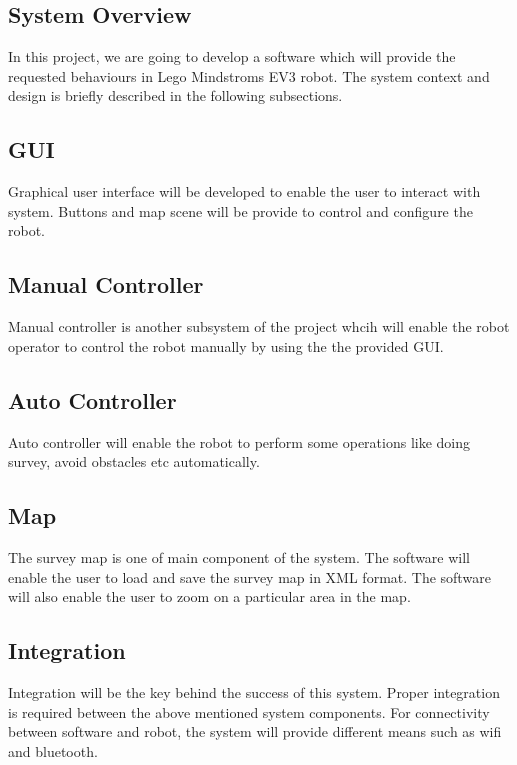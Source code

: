 \subsection{System Overview}
In this project, we are going to develop a software which will provide the requested behaviours in Lego Mindstroms EV3 robot. The system context and design is briefly described in the following subsections.
\subsection{GUI}
Graphical user interface will be developed to enable the user to interact with system. Buttons and map scene will be provide to control and configure the robot.  
\subsection{Manual Controller}
Manual controller is another subsystem of the project whcih will enable the robot operator to control the robot manually by using the the provided GUI. 
\subsection{Auto Controller}
Auto controller will enable the robot to perform some operations like doing survey, avoid obstacles etc automatically. 
\subsection{Map}
The survey map is one of main component of the system. The software will enable the user to load and save the survey map in XML format. The software will also enable the user to zoom on a particular area in the map. 
\subsection{Integration}
Integration will be the key behind the success of this system. Proper integration is required between the above mentioned system components. For connectivity between software and robot, the system will provide different means such as wifi and bluetooth.  
